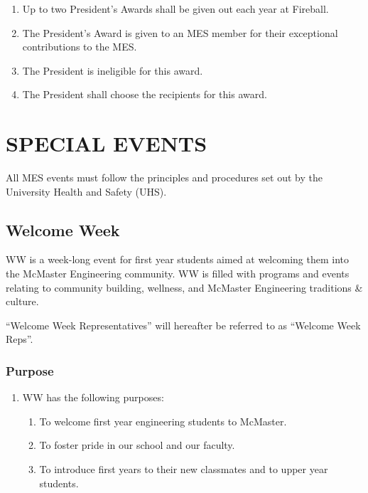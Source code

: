 \begin{enumerate}
\begin{enumerate}
  \begin{enumerate}
   \item
    Up to two President's Awards shall be given out each year at
    Fireball.
   \item
    The President's Award is given to an MES member for their
    exceptional contributions to the MES.
   \item
    The President is ineligible for this award.
   \item
    The President shall choose the recipients for this award.
  \end{enumerate}
\end{enumerate}

\hypertarget{special-events}{%
 \section{SPECIAL EVENTS}
 \label{special-events}}
All MES events must follow the principles and procedures set out by the
University Health and Safety (UHS).

\hypertarget{welcome-week}{%
 \subsection{Welcome Week}
 \label{welcome-week}}

WW is a week-long event for first year students aimed at welcoming them
into the McMaster Engineering community. WW is filled with programs and
events relating to community building, wellness, and McMaster
Engineering traditions \& culture.

``Welcome Week Representatives'' will hereafter be referred to as
``Welcome Week Reps''.

\hypertarget{purpose-1}{%
 \subsubsection{Purpose}
 \label{purpose-1}}

\begin{enumerate}
 \item
  WW has the following purposes:

  \begin{enumerate}
   \item
    To welcome first year engineering students to McMaster.
   \item
    To foster pride in our school and our faculty.
   \item
    To introduce first years to their new classmates and to upper year
    students.


\end{enumerate}
\end{enumerate}
\end{enumerate}
